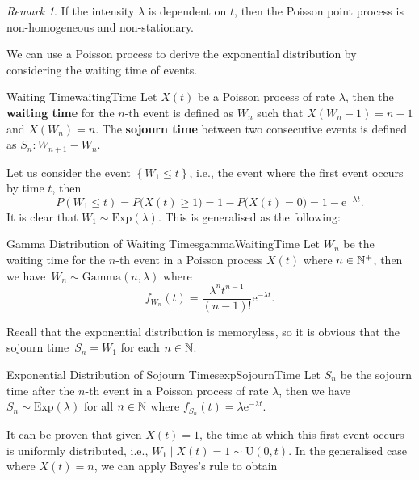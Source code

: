 \documentclass[math, code]{amznotes}
\theoremstyle{remark}
\newtheorem*{remark}{Remark}
\newcommand{\e}{\mathrm{e}}
\begin{document}
\begin{notebox}
    \begin{remark}
        If the intensity $\lambda$ is dependent on $t$, then the Poisson point process is non-homogeneous and non-stationary.
    \end{remark}
\end{notebox}
We can use a Poisson process to derive the exponential distribution by considering the waiting time of events.
\begin{dfnbox}{Waiting Time}{waitingTime}
    Let $X\left(t\right)$ be a Poisson process of rate $\lambda$, then the {\color{red} \textbf{waiting time}} for the $n$-th event is defined as $W_n$ such that $X\left(W_n - 1\right) = n - 1$ and $X\left(W_n\right) = n$. The {\color{red} \textbf{sojourn time}} between two consecutive events is defined as $S_n \colon W_{n + 1} - W_n$.
\end{dfnbox}
Let us consider the event $\left\{W_1 \leq t\right\}$, i.e., the event where the first event occurs by time $t$, then 
\begin{equation*}
    P\left(W_1 \leq t\right) = P\bigl(X\left(t\right) \geq 1\bigr) = 1 - P\bigl(X\left(t\right) = 0\bigr) = 1 - \e^{-\lambda t}.
\end{equation*}
It is clear that $W_1 \sim \mathrm{Exp}\left(\lambda\right)$. This is generalised as the following:
\begin{thmbox}{Gamma Distribution of Waiting Times}{gammaWaitingTime}
    Let $W_n$ be the waiting time for the $n$-th event in a Poisson process $X\left(t\right)$ where $n \in \mathbb{N}^+$, then we have~$W_n \sim \mathrm{Gamma}\left(n, \lambda\right)$ where 
    \begin{equation*}
        f_{W_n}\left(t\right) = \frac{\lambda^n t^{n - 1}}{\left(n - 1\right)!}\e^{-\lambda t}.
    \end{equation*}
\end{thmbox}
Recall that the exponential distribution is memoryless, so it is obvious that the sojourn time~$S_n = W_1$ for each $n \in \mathbb{N}$.
\begin{thmbox}{Exponential Distribution of Sojourn Times}{expSojournTime}
    Let $S_n$ be the sojourn time after the $n$-th event in a Poisson process of rate $\lambda$, then we have~$S_n \sim \mathrm{Exp}\left(\lambda\right)$ for all $n \in \mathbb{N}$ where $f_{S_n}\left(t\right) = \lambda \e^{-\lambda t}$.
\end{thmbox}
It can be proven that given $X\left(t\right) = 1$, the time at which this first event occurs is uniformly distributed, i.e., $W_1 \mid X\left(t\right) = 1 \sim \mathrm{U}\left(0, t\right)$. In the generalised case where $X\left(t\right) = n$, we can apply Bayes's rule to obtain 
\end{document}
